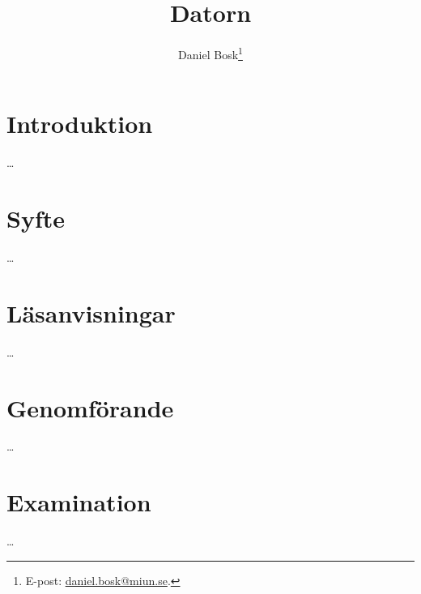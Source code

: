 \documentclass[11pt,a4paper]{miunasgn}
\title{Datorn}
\author{Daniel Bosk\footnote{%
	E-post: \href{mailto:daniel.bosk@miun.se}{daniel.bosk@miun.se}.
}}
\date{\svnId}
\begin{document}
\maketitle
\thispagestyle{foot}
\tableofcontents


\section{Introduktion}
\label{sec:Introduktion}
\noindent
\dots


\section{Syfte}
\label{sec:Syfte}
\noindent
\dots


\section{Läsanvisningar}
\label{sec:Lasanvisningar}
\noindent
\dots


\section{Genomförande}
\label{sec:Genomforande}
\noindent
\dots


\section{Examination}
\label{sec:Examination}
\noindent
\dots



\end{document}
